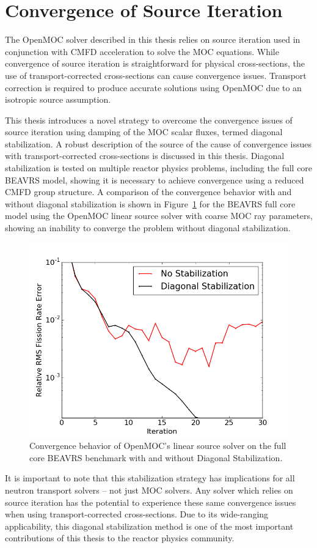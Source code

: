 \documentclass[12pt,twoside]{mitthesis-exec}
\begin{document}
\section*{Convergence of Source Iteration}

The OpenMOC solver described in this thesis relies on source iteration used in conjunction with CMFD acceleration to solve the MOC equations. While convergence of source iteration is straightforward for physical cross-sections, the use of transport-corrected cross-sections can cause convergence issues. Transport correction is required to produce accurate solutions using OpenMOC due to an isotropic source assumption.

This thesis introduces a novel strategy to overcome the convergence issues of source iteration using damping of the MOC scalar fluxes, termed diagonal stabilization. A robust description of the source of the cause of convergence issues with transport-corrected cross-sections is discussed in this thesis. Diagonal stabilization is tested on multiple reactor physics problems, including the full core BEAVRS model, showing it is necessary to achieve convergence using a reduced CMFD group structure. A comparison of the convergence behavior with and without diagonal stabilization is shown in Figure~\ref{fig:fc-3D-ls} for the BEAVRS full core model using the OpenMOC linear source solver with coarse MOC ray parameters, showing an inability to converge the problem without diagonal stabilization.
	
\begin{figure}[ht!]
	\centering
	\includegraphics[width=0.65\linewidth]{figures/convergence/full-core-3D-ls.png}
	\caption{Convergence behavior of OpenMOC's linear source solver on the full core BEAVRS benchmark with and without Diagonal Stabilization.}
	\label{fig:fc-3D-ls}
\end{figure}

It is important to note that this stabilization strategy has implications for all neutron transport solvers -- not just MOC solvers. Any solver which relies on source iteration has the potential to experience these same convergence issues when using transport-corrected cross-sections. Due to its wide-ranging applicability, this diagonal stabilization method is one of the most important contributions of this thesis to the reactor physics community. 
\end{document}

